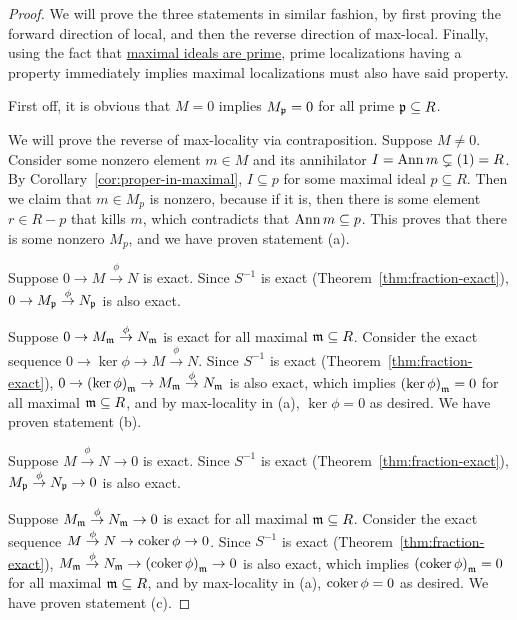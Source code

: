 \begin{proof}
    We will prove the three statements in similar fashion,
    by first proving the forward direction of local,
    and then the reverse direction of max-local.
    Finally, using the fact that \hyperref[thm:maximal-prime-radical]{maximal ideals are prime},
    prime localizations having a property immediately implies
    maximal localizations must also have said property.

    \medskip

    First off, it is obvious that \(M = 0\)
    implies \(M_{\mathfrak{p}} = 0\) for all prime \(\mathfrak{p} \subseteq R\).

    We will prove the reverse of max-locality via contraposition.
    Suppose \(M \neq 0\).
    Consider some nonzero element \(m \in M\)
    and its annihilator \(I = \operatorname{Ann} m \subsetneq (1) = R\).
    By Corollary~\ref{cor:proper-in-maximal},
    \(I \subseteq p\) for some maximal ideal \(p \subseteq R\).
    Then we claim that \(m \in M_p\) is nonzero,
    because if it is, then there is some element \(r \in R - p\) that kills \(m\),
    which contradicts that \(\operatorname{Ann} m \subseteq p\).
    This proves that there is some nonzero \(M_p\),
    and we have proven statement (a).

    \medskip

    Suppose \(0 \to M \overset{\phi}{\to} N\) is exact.
    Since \(S^{-1}\) is exact (Theorem~\ref{thm:fraction-exact}),
    \(0 \to M_{\mathfrak{p}} \overset{\phi}{\to} N_{\mathfrak{p}}\) is also exact.
    
    Suppose \(0 \to M_{\mathfrak{m}} \overset{\phi}{\to} N_{\mathfrak{m}}\) is exact for all maximal \(\mathfrak{m} \subseteq R\).
    Consider the exact sequence \(0 \to \ker\phi \to M \overset{\phi}{\to} N\).
    Since \(S^{-1}\) is exact (Theorem~\ref{thm:fraction-exact}),
    \(0 \to {(\ker\phi)}_{\mathfrak{m}} \to M_{\mathfrak{m}} \overset{\phi}{\to} N_{\mathfrak{m}}\) is also exact,
    which implies \({(\ker\phi)}_{\mathfrak{m}} = 0\) for all maximal \(\mathfrak{m} \subseteq R\),
    and by max-locality in (a), \(\ker\phi = 0\) as desired.
    We have proven statement (b).
    
    \medskip
    
    Suppose \(M \overset{\phi}{\to} N \to 0\) is exact.
    Since \(S^{-1}\) is exact (Theorem~\ref{thm:fraction-exact}),
    \(M_{\mathfrak{p}} \overset{\phi}{\to} N_{\mathfrak{p}} \to 0\) is also exact.
    
    Suppose \(M_{\mathfrak{m}} \overset{\phi}{\to} N_{\mathfrak{m}} \to 0\) is exact for all maximal \(\mathfrak{m} \subseteq R\).
    Consider the exact sequence \(M \overset{\phi}{\to} N \to \operatorname{coker}\phi \to 0\).
    Since \(S^{-1}\) is exact (Theorem~\ref{thm:fraction-exact}),
    \(M_{\mathfrak{m}} \overset{\phi}{\to} N_{\mathfrak{m}} \to {(\operatorname{coker}\phi)}_{\mathfrak{m}} \to 0\) is also exact,
    which implies \({(\operatorname{coker}\phi)}_{\mathfrak{m}} = 0\) for all maximal \(\mathfrak{m} \subseteq R\),
    and by max-locality in (a), \(\operatorname{coker}\phi = 0\) as desired.
    We have proven statement (c).
\end{proof}
